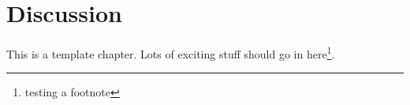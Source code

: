 \chapter{Discussion}
This is a template chapter. Lots of exciting stuff should go in here\footnote{testing a footnote}.


